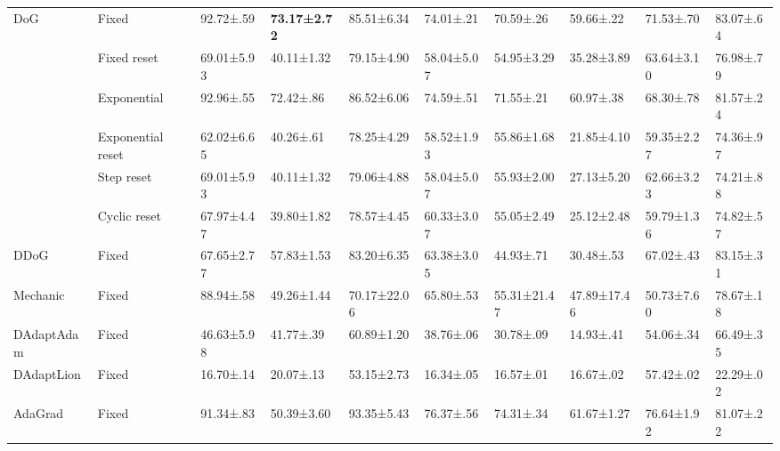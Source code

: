 \begin{tabular}{llllllllll}
    \multirow[c]{6}{*}{DoG}  & Fixed             & 92.72±.59           & \bfseries 73.17±2.72 & 85.51±6.34          & 74.01±.21           & 70.59±.26           & 59.66±.22           & 71.53±.70           & 83.07±.64           \\
                             & Fixed reset       & 69.01±5.93          & 40.11±1.32           & 79.15±4.90          & 58.04±5.07          & 54.95±3.29          & 35.28±3.89          & 63.64±3.10          & 76.98±.79           \\
                             & Exponential       & 92.96±.55           & 72.42±.86            & 86.52±6.06          & 74.59±.51           & 71.55±.21           & 60.97±.38           & 68.30±.78           & 81.57±.24           \\
                             & Exponential reset & 62.02±6.65          & 40.26±.61            & 78.25±4.29          & 58.52±1.93          & 55.86±1.68          & 21.85±4.10          & 59.35±2.27          & 74.36±.97           \\
                             & Step reset        & 69.01±5.93          & 40.11±1.32           & 79.06±4.88          & 58.04±5.07          & 55.93±2.00          & 27.13±5.20          & 62.66±3.23          & 74.21±.88           \\
                             & Cyclic reset      & 67.97±4.47          & 39.80±1.82           & 78.57±4.45          & 60.33±3.07          & 55.05±2.49          & 25.12±2.48          & 59.79±1.36          & 74.82±.57           \\
    DDoG                     & Fixed             & 67.65±2.77          & 57.83±1.53           & 83.20±6.35          & 63.38±3.05          & 44.93±.71           & 30.48±.53           & 67.02±.43           & 83.15±.31           \\
    Mechanic                 & Fixed             & 88.94±.58           & 49.26±1.44           & 70.17±22.06         & 65.80±.53           & 55.31±21.47         & 47.89±17.46         & 50.73±7.60          & 78.67±.18           \\
    DAdaptAdam               & Fixed             & 46.63±5.98          & 41.77±.39            & 60.89±1.20          & 38.76±.06           & 30.78±.09           & 14.93±.41           & 54.06±.34           & 66.49±.35           \\
    DAdaptLion               & Fixed             & 16.70±.14           & 20.07±.13            & 53.15±2.73          & 16.34±.05           & 16.57±.01           & 16.67±.02           & 57.42±.02           & 22.29±.02           \\
    AdaGrad                  & Fixed             & 91.34±.83           & 50.39±3.60           & 93.35±5.43          & 76.37±.56           & 74.31±.34           & 61.67±1.27          & 76.64±1.92          & 81.07±.22           \\
    \bottomrule
\end{tabular}
